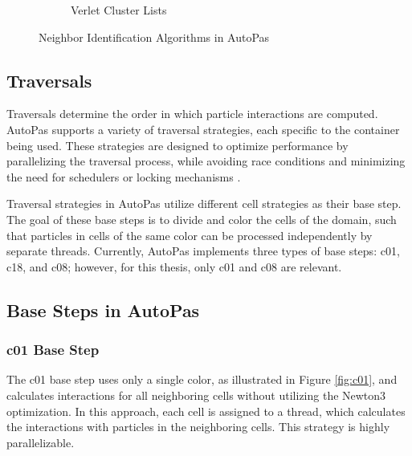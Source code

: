\begin{figure}[h!]
\begin{subfigure}{0.22\textwidth}
        \caption{\scriptsize Verlet Cluster Lists}
        \label{fig:verletclusters}
    \end{subfigure}
    \caption{Neighbor Identification Algorithms in AutoPas \parencite{gratl2022n}}
\end{figure}



\subsection{Traversals}

Traversals determine the order in which particle interactions are computed. AutoPas supports a variety of traversal strategies, each specific to the container being used. These strategies are designed to optimize performance by parallelizing the traversal process, while avoiding race conditions and minimizing the need for schedulers or locking mechanisms \parencite{gratl2019autopas}.

Traversal strategies in AutoPas utilize different cell strategies as their base step. The goal of these base steps is to divide and color the cells of the domain, such that particles in cells of the same color can be processed independently by separate threads. Currently, AutoPas implements three types of base steps: c01, c18, and c08; however, for this thesis, only c01 and c08 are relevant.

\subsection{Base Steps in AutoPas}

\subsubsection{c01 Base Step} The c01 base step uses only a single color, as illustrated in Figure \ref{fig:c01}, and calculates interactions for all neighboring cells without utilizing the Newton3 optimization. In this approach, each cell is assigned to a thread, which calculates the interactions with particles in the neighboring cells. This strategy is highly parallelizable.


